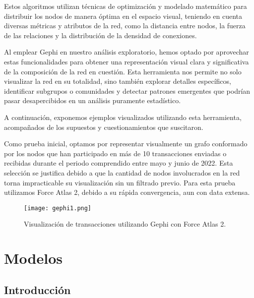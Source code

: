 \documentclass{article}
\begin{document}
Estos algoritmos utilizan técnicas de optimización y modelado matemático para distribuir los nodos de manera óptima en el espacio visual, teniendo en cuenta diversas métricas y atributos de la red, como la distancia entre nodos, la fuerza de las relaciones y la distribución de la densidad de conexiones.

Al emplear Gephi en nuestro análisis exploratorio, hemos optado por aprovechar estas funcionalidades para obtener una representación visual clara y significativa de la composición de la red en cuestión. Esta herramienta nos permite no solo visualizar la red en su totalidad, sino también explorar detalles específicos, identificar subgrupos o comunidades y detectar patrones emergentes que podrían pasar desapercibidos en un análisis puramente estadístico.


A continuación, exponemos ejemplos visualizados utilizando esta herramienta, acompañados de los supuestos y cuestionamientos que suscitaron.

Como prueba inicial, optamos por representar visualmente un grafo conformado por los nodos que han participado en más de 10 transacciones enviadas o recibidas durante el periodo comprendido entre mayo y junio de 2022. Esta selección se justifica debido a que la cantidad de nodos involucrados en la red torna impracticable su visualización sin un filtrado previo. Para esta prueba utilizamos Force Atlas 2, debido a su rápida convergencia, aun con data extensa.
\begin{figure}[h!]
    \centering
    \texttt{[image: gephi1.png]} %
    \caption{Visualización de transacciones utilizando Gephi con Force Atlas 2.}
    \label{fig:ejemplo}
\end{figure}

\section{Modelos}

\subsection{Introducción}
\end{document}

